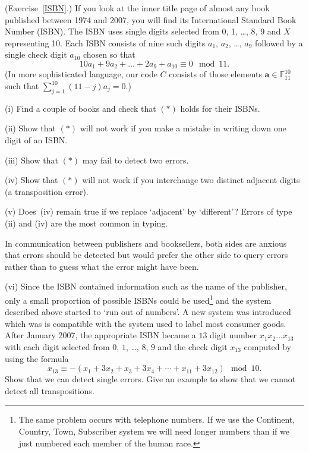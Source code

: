 \begin{question}\label{C2.3} (Exercise~\ref{ISBN}.)
If you look
at the inner
title page of almost any book
published between 1974 and 2007,
you will find its International Standard
Book Number (ISBN). The ISBN
uses single digits selected from 0, 1, \dots, 8, 9
and $X$ representing 10. Each ISBN consists
of nine such digits $a_{1}$, $a_{2}$, \dots, $a_{9}$
followed by a single check digit $a_{10}$ chosen
so that
\begin{equation*}
10a_{1}+9a_{2}+ \dots+2a_{9}+a_{10}\equiv 0\mod{11}.\tag*{(*)}
\end{equation*}
(In more sophisticated language, our code $C$ consists
of those elements ${\mathbf a}\in {\mathbb F}_{11}^{10}$
such that $\sum_{j=1}^{10}(11-j)a_{j}=0$.)


(i) Find a couple of books
and check that $(*)$ holds for their ISBNs.

(ii) Show that $(*)$ will not work if you make a mistake
in writing down one digit of an ISBN.

(iii) Show that
$(*)$ may fail to detect two errors.

(iv)  Show that $(*)$ will not work if you interchange
two distinct adjacent digits (a transposition error).

(v) Does~(iv) remain true if we replace `adjacent'
by `different'?
\noindent Errors of type (ii) and (iv) are the most common
in typing.

In communication between publishers and booksellers,
both sides are anxious that errors should be detected
but would prefer the other side to query errors
rather than to guess what the error might have been.

(vi) Since the ISBN contained information such as the name of the
publisher, only a small proportion of possible ISBNs could
be used\footnote{The same problem occurs with telephone numbers.
If we use the Continent, Country, Town, Subscriber system
we will need longer numbers than if we just numbered
each member of the human race.} 
and the system described above
started to `run out of numbers'. A new system
was  introduced which was
is compatible with the system used to label most consumer goods.
After January 2007, the appropriate ISBN became a $13$ digit number
$x_{1}x_{2}\dots x_{13}$ with each digit 
selected from $0$, $1$, \dots, $8$, $9$ and
the check digit $x_{13}$ computed by using the formula
\[x_{13}\equiv -(x_{1}+3x_{2}+x_{3}+3x_{4}+\cdots+x_{11}+ 3x_{12}) 
\mod{10}.\]
Show that we can detect single errors. Give an example
to show that we cannot detect all transpositions.
\end{question}
